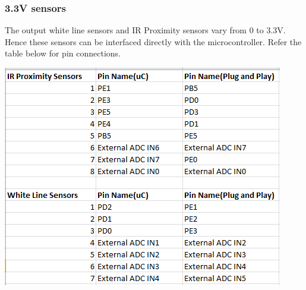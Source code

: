 \documentclass[a4paper,10pt,oneside]{article}
\begin{document}
{		\subsubsection{\Large \textbf{3.3V sensors}}
		{The output white line sensors and IR Proximity sensors vary from 0  to 3.3V. Hence these sensors can be interfaced directly with the microcontroller. Refer the table below for pin connections.\\
		\begin{center}
		\includegraphics{3v3Sensors}\\
		\end{center}
	}
}
\end{document}
